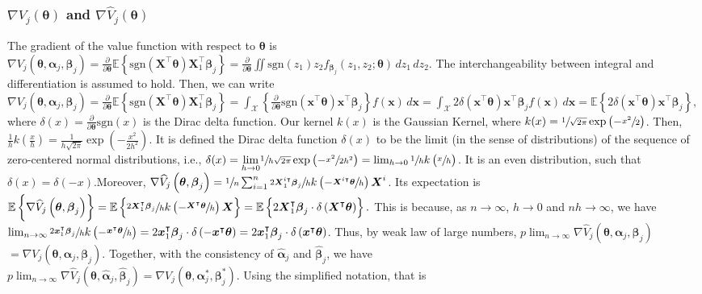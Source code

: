 \documentclass{article}
\newcommand{\wh}{\widehat}
\newcommand{\itl}{\intercal}
\newcommand{\bs}{ \boldsymbol}
\newcommand{\mb}{\mathbb}
\newcommand{\ml}{\mathcal}
\newcommand{\txt}{\text}
\newcommand{\lt}{\left}
\newcommand{\rt}{\right}
\newcommand{\tsgn}{\txt{sgn}}
\begin{document}
\begin{appendices}
\subsubsection{$\nabla V_j(\bs{\theta})$ and $\nabla\wh{V}_j(\bs{\theta})$}
The gradient of the value function with respect to $\bs{\theta}$ is \\
$\nabla V_j\lt(\bs{\theta}, \bs{\alpha}_j, \bs{\beta}_j\rt) = \frac{\partial}{\partial \bs{\theta}} \mb{E}\lt\{ \tsgn\lt(\bs{X}^{\itl}\bs{\theta}\rt)\bs{X}_1^{\itl}\bs{\beta}_j \rt\} =\frac{\partial}{\partial \bs{\theta}} \iint \tsgn\lt(z_1\rt)z_2 f_{\bs{\beta}_j}\lt(z_1, z_2; \bs{\theta}\rt) \,dz_1 \,dz_2$.
The interchangeability between integral and differentiation is assumed to hold. Then, we can write $\nabla V_j\lt(\bs{\theta}, \bs{\alpha}_j, \bs{\beta}_j\rt)
 =\frac{\partial}{\partial \bs{\theta}} \mb{E}\lt\{ \tsgn\lt(\bs{X}^{\itl}\bs{\theta}\rt)\bs{X}_1^{\itl}\bs{\beta}_j \rt\} 
=  \int_{\bs{\ml{X}}}\lt\{\frac{\partial}{\partial \bs{\theta}} \tsgn\lt( \bs{x}^{\itl}\bs{\theta}\rt)\bs{x}^{\itl}\bs{\beta}_j\rt\}f(\bs{x})\,d\bs{x}
= \int_{\bs{\ml{X}}} 2\delta\lt( \bs{x}^{\itl}\bs{\theta} \rt)\bs{x}^{\itl}\bs{\beta}_j f(\bs{x})\,d\bs{x}
= \mb{E}\lt\{ 2\delta\lt( \bs{x}^{\itl}\bs{\theta} \rt)\bs{x}^{\itl}\bs{\beta}_j\rt\},$ 
where $\delta(x) = \frac{\partial}{\partial \bs{\theta}}\tsgn(x)$ is the Dirac delta function.
Our kernel $k(x)$ is the Gaussian Kernel, where $k(x) = \sfrac{1}{\sqrt{2\pi}} \exp\lt( - \sfrac{x^2}{2}\rt)$. Then, $\frac{1}{h}k\lt(\frac{x}{h}\rt) = \frac{1}{h\sqrt{2\pi}} \exp\lt( - \frac{x^2}{2h^2}\rt)$. It is defined the Dirac delta function $\delta(x)$ to be the limit (in the sense of distributions) of the sequence of zero-centered normal distributions, i.e., $\delta(x) = \underset{h \to 0}{\lim}\sfrac{1}{h\sqrt{2\pi}} \exp\lt(-\sfrac{x^2}{2h^2}\rt) = \lim_{h \to 0}\sfrac{1}{h}k\lt(\sfrac{x}{h}\rt)$. It is an even distribution, such that $\delta(x) = \delta(-x)$.Moreover, $\nabla\wh{V}_j\lt(\bs{\theta}, \bs{\beta}_j\rt)=  \sfrac{1}{n}\sum_{i=1}^{n}\sfrac{2\bs{X}_{1}^{i\itl}\bs{\beta}_{j}}{h}k\lt(-\sfrac{\bs{X}^{i\itl}\bs{\theta}}{h}\rt)\bs{X}^{i}$. Its expectation is $\mb{E}\lt\{ \nabla\wh{V}_j\lt(\bs{\theta}, \bs{\beta}_j\rt) \rt\}=  \mb{E}\lt\{ \sfrac{2\bs{X}_{1}^{\itl}\bs{\beta}_{j}}{h}k\lt(-\sfrac{\bs{X}^{\itl}\bs{\theta}}{h}\rt)\bs{X}\rt\} = \mb{E}\lt\{2\bs{X}_{1}^{\itl}\bs{\beta}_{j}\cdot\delta\lt(\bs{X}^{\itl}\bs{\theta}\rt)\rt\}.$ This is because, as $n\to \infty$, $h \to 0$  and $nh \to \infty$, we have $\lim_{n \to \infty} \sfrac{2\bs{x}_1^{\itl}\bs{\beta}_{j}}{h}k\lt(-\sfrac{\bs{x}^{\itl}\bs{\theta}}{h}\rt) = 2\bs{x}_{1}^{\itl}\bs{\beta}_{j}\cdot\delta\lt(-\bs{x}^{\itl}\bs{\theta}\rt)= 2\bs{x}_{1}^{\itl}\bs{\beta}_{j}\cdot\delta\lt(\bs{x}^{\itl}\bs{\theta}\rt)$. Thus, by weak law of large numbers, $p\lim_{n\to\infty}\nabla\wh{V}_j\lt(\bs{\theta}, \bs{\alpha}_j, \bs{\beta}_j\rt)$ \\$=\nabla V_j\lt(\bs{\theta}, \bs{\alpha}_j, \bs{\beta}_j\rt)$. Together, with the consistency of $\wh{\bs{\alpha}}_j$ and $\wh{\bs{\beta}}_j$, we have \\$p\lim_{n\to\infty}\nabla\wh{V}_j\lt(\bs{\theta},\wh{\bs{\alpha}}_j, \wh{\bs{\beta}}_j\rt)=  \nabla V_j\lt(\bs{\theta}, \bs{\alpha}^*_j, \bs{\beta}^*_j\rt)$. Using the simplified notation, that is 

\end{appendices}
\end{document}
